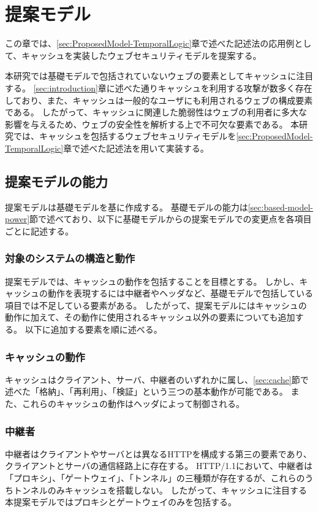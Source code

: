 \documentclass[journal]{IEEEtran}
\begin{document}
\section{提案モデル}
この章では、\ref{sec:ProposedModel-TemporalLogic}章で述べた記述法の応用例として、キャッシュを実装したウェブセキュリティモデルを提案する。

本研究では基礎モデルで包括されていないウェブの要素としてキャッシュに注目する。
\ref{sec:introduction}章に述べた通りキャッシュを利用する攻撃が数多く存在しており、また、キャッシュは一般的なユーザにも利用されるウェブの構成要素である。
したがって、キャッシュに関連した脆弱性はウェブの利用者に多大な影響を与えるため、ウェブの安全性を解析する上で不可欠な要素である。
本研究では、キャッシュを包括するウェブセキュリティモデルを\ref{sec:ProposedModel-TemporalLogic}章で述べた記述法を用いて実装する。

\subsection{提案モデルの能力}
\label{sec:ProposedModel-Power}
提案モデルは基礎モデルを基に作成する。
基礎モデルの能力は\ref{sec:based-model-power}節で述べており、以下に基礎モデルからの提案モデルでの変更点を各項目ごとに記述する。

\subsubsection{対象のシステムの構造と動作}
提案モデルでは、キャッシュの動作を包括することを目標とする。
しかし、キャッシュの動作を表現するには中継者やヘッダなど、基礎モデルで包括している項目では不足している要素がある。
したがって、提案モデルにはキャッシュの動作に加えて、その動作に使用されるキャッシュ以外の要素についても追加する。
以下に追加する要素を順に述べる。

\subsubsection{キャッシュの動作}
キャッシュはクライアント、サーバ、中継者のいずれかに属し、\ref{sec:cache}節で述べた「格納」、「再利用」、「検証」という三つの基本動作が可能である。
また、これらのキャッシュの動作はヘッダによって制御される。

\subsubsection{中継者}
中継者はクライアントやサーバとは異なるHTTPを構成する第三の要素であり、クライアントとサーバの通信経路上に存在する。
HTTP/1.1において、中継者は「プロキシ」、「ゲートウェイ」、「トンネル」の三種類が存在するが、これらのうちトンネルのみキャッシュを搭載しない。
したがって、キャッシュに注目する本提案モデルではプロキシとゲートウェイのみを包括する。
\end{document}
